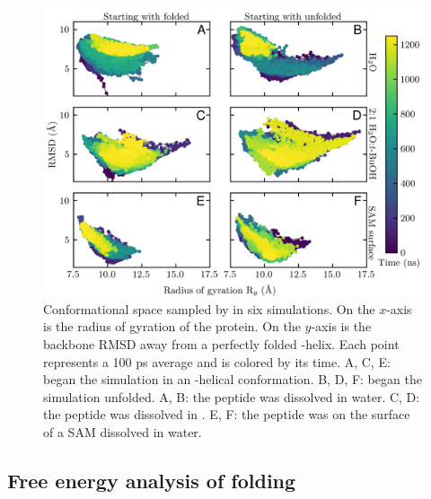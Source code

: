 \begin{figure}
    \center
    \includegraphics[width=6.0in]{figures-helix/combined_rgyr_v_rmsd.png}
    \caption{
        Conformational space sampled by \pep{} in six simulations. 
        On the $x$-axis is the radius of gyration of the protein. 
        On the $y$-axis is the backbone RMSD away from a perfectly folded \textalpha{}-helix. 
        Each point represents a 100 ps average and is colored by its time. 
        A, C, E: \pep{} began the simulation in an \textalpha{}-helical conformation. 
        B, D, F: \pep{} began the simulation unfolded. 
        A, B: the peptide was dissolved in water. 
        C, D: the peptide was dissolved in \tbawat{}. 
        E, F: the peptide was on the surface of a SAM dissolved in water.
    }
    \label{fig:helix-rgyr_v_rmsd}
\end{figure}

\subsection{Free energy analysis of folding}


